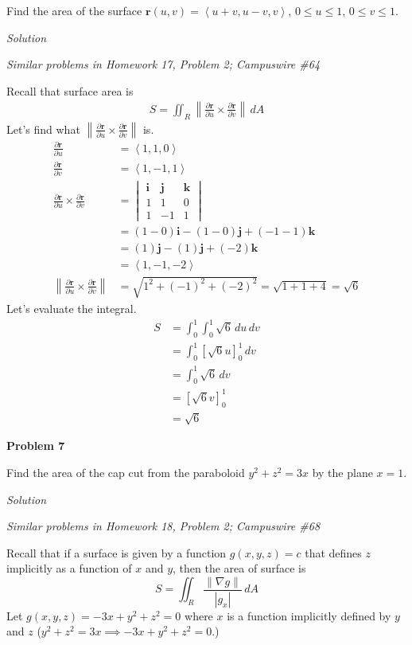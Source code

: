 \documentclass{article}
\newcommand{\lrp}[1]{\left( #1 \right)}
\newcommand{\lra}[1]{\left\langle #1 \right\rangle}
\newcommand{\lrb}[1]{\left[ #1 \right]}
\newcommand{\norm}[1]{\left\lVert #1 \right\rVert}
\renewcommand{\i}[0]{\mathbf{{i}}}
\renewcommand{\j}[0]{\mathbf{{j}}}
\renewcommand{\k}[0]{\mathbf{{k}}}
\renewcommand{\r}[0]{\mathbf{r}}
\newcommand{\Solution}{\textit{Solution}}
\begin{document}
Find the area of the surface $\r(u,v)=\lra{u+v,u-v,v}$, $0\leq u\leq 1$, $0\leq v\leq 1$.

\Solution

\textit{Similar problems in Homework 17, Problem 2; Campuswire \#64}

Recall that surface area is
\begin{align*}
    S=\iint_R \norm{\frac{\partial \r}{\partial u}\times \frac{\partial \r}{\partial v}}\,dA
\end{align*}
Let's find what $\displaystyle \norm{\frac{\partial \r}{\partial u}\times \frac{\partial \r}{\partial v}}$ is.
\begin{align*}
    \frac{\partial \r}{\partial u}&=\lra{1, 1, 0}\\
    \frac{\partial \r}{\partial v}&=\lra{1,-1,1}\\
    \frac{\partial \r}{\partial u}\times   \frac{\partial \r}{\partial v}&=\begin{vmatrix}\i & \j & \k \\ 1 & 1 & 0\\ 1 & -1 & 1\end{vmatrix}\\
      &=\lrp{1 - 0}\i-\lrp{1 - 0}\j + \lrp{-1-1}\k\\
      &=\lrp{1}\j - \lrp{1}\j + \lrp{-2}\k\\
      &=\lra{1,-1,-2}\\
    \norm{\frac{\partial \r}{\partial u}\times   \frac{\partial \r}{\partial v}}&=\sqrt{1^2+(-1)^2+(-2)^2}=\sqrt{1+1+4}=\sqrt{6}  
\end{align*}
Let's evaluate the integral.
\begin{align*}
    S&=\int_0^1\int_0^1 \sqrt{6}\,du\,dv\\
    &=\int_0^1 \lrb{\sqrt{6}u}_0^1\,dv\\
    &=\int_0^1 \sqrt{6}\,dv\\
    &=\lrb{\sqrt{6}v}_0^1\\
    &=\boxed{\sqrt{6}}
\end{align*}
{}\textbf{Problem 7}

Find the area of the cap cut from the paraboloid $y^2+z^2=3x$ by the plane $x=1$.

\Solution

\textit{Similar problems in Homework 18, Problem 2; Campuswire \#68}

Recall that if a surface is given by a function $g(x,y,z)=c$ that defines $z$ implicitly as a function of $x$ and $y$, then the area of surface is
\begin{equation*}
    S=\iint_R \frac{\norm{\nabla g}}{\left| g_x\right|}\,dA
\end{equation*}
Let $g(x,y,z)=-3x+y^2+z^2=0$ where $x$ is a function implicitly defined by $y$ and $z$ ($y^2+z^2=3x\implies -3x+y^2+z^2=0$.)
\end{document}
